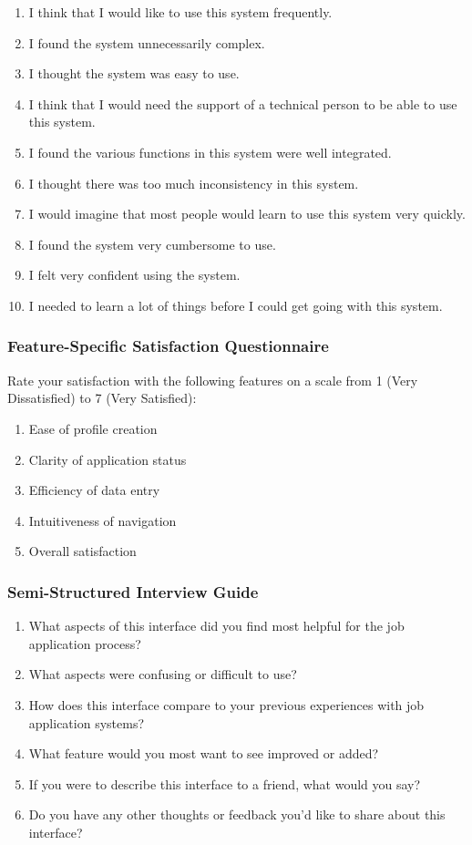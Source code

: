 \documentclass[
	letterpaper, %
]{jdf}
\begin{document}
\begin{enumerate}
    \item I think that I would like to use this system frequently.
    \item I found the system unnecessarily complex.
    \item I thought the system was easy to use.
    \item I think that I would need the support of a technical person to be able to use this system.
    \item I found the various functions in this system were well integrated.
    \item I thought there was too much inconsistency in this system.
    \item I would imagine that most people would learn to use this system very quickly.
    \item I found the system very cumbersome to use.
    \item I felt very confident using the system.
    \item I needed to learn a lot of things before I could get going with this system.
\end{enumerate}

\subsubsection{Feature-Specific Satisfaction Questionnaire}

Rate your satisfaction with the following features on a scale from 1 (Very Dissatisfied) to 7 (Very Satisfied):

\begin{enumerate}
    \item Ease of profile creation
    \item Clarity of application status
    \item Efficiency of data entry
    \item Intuitiveness of navigation
    \item Overall satisfaction
\end{enumerate}

\subsubsection{Semi-Structured Interview Guide}

\begin{enumerate}
    \item What aspects of this interface did you find most helpful for the job application process?
    \item What aspects were confusing or difficult to use?
    \item How does this interface compare to your previous experiences with job application systems?
    \item What feature would you most want to see improved or added?
    \item If you were to describe this interface to a friend, what would you say?
    \item Do you have any other thoughts or feedback you'd like to share about this interface?
\end{enumerate}
\end{document}
